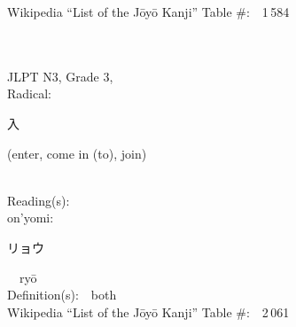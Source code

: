 \begin{multicols}{2}
Wikipedia ``List of the J\=oy\=o Kanji'' Table \#:\ \ 1\,584 \\
\ \ \\
{\fontsize{34pt}{40pt}  }\ \ \\  %
{JLPT N3, Grade 3, \\Radical:\ \ {\begin{CJK}{UTF8}{min} 入 \end{CJK}} (enter, come in (to), join) } \\
Reading(s):\ \ \\
{\hspace*{1em}}on'yomi:\ \ \\
{\hspace*{2em}}{\begin{CJK}{UTF8}{min} リョウ \end{CJK}}\ \ ry\=o\ \ \\
Definition(s):\ \ both \\
Wikipedia ``List of the J\=oy\=o Kanji'' Table \#:\ \ 2\,061 \\
\ \ \\
\end{multicols}



